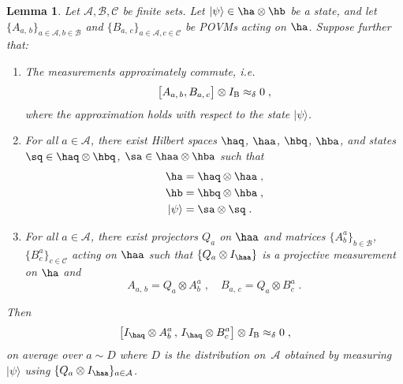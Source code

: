 \documentclass[11pt]{article}
\newtheorem{lemma}[theorem]{Lemma}
\theoremstyle{definition}
\newcommand{\ket}[1]{|#1\rangle}
\newcommand{\Id}{\ensuremath{I}}
\newcommand{\mA}{\ensuremath{\mathcal{A}}}
\newcommand{\mB}{\ensuremath{\mathcal{B}}}
\newcommand{\mC}{\ensuremath{\mathcal{C}}}
\newcommand{\labelstyle}[1]{\ensuremath{\textsc{#1}}\xspace}
\newcommand{\bob}{\labelstyle{B}}
\renewcommand{\cal}[1]{\mathcal{#1}}
\begin{document}
\begin{lemma}\label{lem:commutation-simplification}
  Let $\mA,\mB,\mC$ be finite sets.
  Let $\ket{\psi} \in \ha \otimes \hb$ be a state, and let $\{A_{a,\, b}\}_{a
    \in \mA, b \in \cal{B}}$ and $\{B_{a,\, c}\}_{a \in \mA, c \in \cal{C}}$ be
  POVMs acting on $\ha$.
  Suppose further that:
  \begin{enumerate}
  \item The measurements approximately commute,
    i.e.\, \label{item:almost-compute}
    \begin{equation*}
      \bigl[ A_{a,\, b}, B_{a,\, c} \bigr] \otimes \Id_\bob \approx_\delta 0\;,
    \end{equation*}
    where the approximation holds with respect to the state $\ket{\psi}$. 
  \item For all $a \in \cal{A}$, there exist Hilbert spaces $\haq$, $\haa$,
    $\hbq$, $\hba$, and states $\sq \in \haq \otimes
    \hbq$, $\sa \in \haa \otimes \hba$ such that
    \begin{align*}
      \ha & = \haq \otimes \haa\;,\\
      \hb & = \hbq \otimes \hba\;,\\
      \ket{\psi} & = \sa \otimes \sq\;.
    \end{align*}
  \item \label{item:weird-decomposition} For all $a \in \cal{A}$, there exist
    projectors $Q_a$ on $\haa$ and matrices $\{A^{a}_b\}_{b \in
      \cal{B}}$, $\{B^{a}_c\}_{c \in \cal{C}}$ acting on $\haa$
    such that $\{Q_a \otimes \Id_{\haa}\}$ is a projective
    measurement on $\ha$ and
    \begin{equation*}
      A_{a, \, b} = Q_a \otimes A^a_b\;, \quad
      B_{a, \, c} = Q_a \otimes B^a_c\;.
    \end{equation*}
  \end{enumerate}
  Then
  \begin{equation*}
    \bigl[ \Id_{\haq} \otimes A^{a}_b \,,\, \Id_{\haq}
    \otimes B^{a}_c \bigr] \otimes \Id_\bob \approx_\delta 0\;,
  \end{equation*}
  on average over $a \sim D$ where $D$ is the distribution on~$\cal{A}$ obtained
  by measuring $\ket{\psi}$ using $\{ Q_a \otimes I_{\haa} \}_{a \in \cal{A}}$.
\end{lemma}
 
\end{document}
